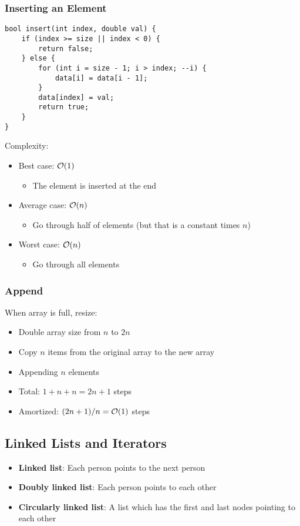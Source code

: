 \subsubsection{Inserting an Element}
\begin{lstlisting}[style=C++]
bool insert(int index, double val) {
    if (index >= size || index < 0) {
        return false;
    } else {
        for (int i = size - 1; i > index; --i) {
            data[i] = data[i - 1];
        }
        data[index] = val;
        return true;
    }
}
\end{lstlisting}
Complexity:
\begin{itemize}
	\item Best case: $\mathcal{O}(1)$
	\begin{itemize}
		\item The element is inserted at the end
	\end{itemize}

	\item Average case: $\mathcal{O}(n)$
	\begin{itemize}
		\item Go through half of elements (but that is a constant times $n$)
	\end{itemize}

	\item Worst case: $\mathcal{O}(n)$
	\begin{itemize}
		\item Go through all elements
	\end{itemize}
\end{itemize}

\subsubsection{Append}
When array is full, resize:
\begin{itemize}
	\item Double array size from $n$ to $2n$
	\item Copy $n$ items from the original array to the new array
	\item Appending $n$ elements
	\item Total: $1 + n + n = 2n + 1$ steps
	\item Amortized: $(2n+1)/n=\mathcal{O}(1)$ steps
\end{itemize}

\subsection{Linked Lists and Iterators}
\begin{itemize}
	\item \textbf{Linked list}: Each person points to the next person
	\item \textbf{Doubly linked list}: Each person points to each other
	\item \textbf{Circularly linked list}: A list which has the first and last nodes pointing to each other
\end{itemize}

